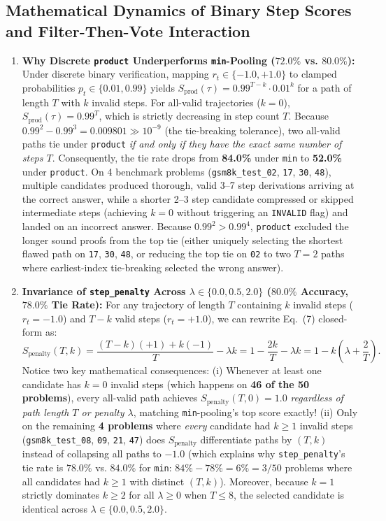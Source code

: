 \documentclass[10pt,a4paper]{article}
\begin{document}
\subsection{Mathematical Dynamics of Binary Step Scores and Filter-Then-Vote Interaction}
\begin{enumerate}
    \item \textbf{Why Discrete \texttt{product} Underperforms \texttt{min}-Pooling ($72.0\%$ vs. $80.0\%$):}
    Under discrete binary verification, mapping $r_t \in \{-1.0, +1.0\}$ to clamped probabilities $p_t \in \{0.01, 0.99\}$ yields $S_{\text{prod}}(\tau) = 0.99^{T-k} \cdot 0.01^k$ for a path of length $T$ with $k$ invalid steps. For all-valid trajectories ($k=0$), $S_{\text{prod}}(\tau) = 0.99^T$, which is strictly decreasing in step count $T$. Because $0.99^2 - 0.99^3 = 0.009801 \gg 10^{-9}$ (the tie-breaking tolerance), two all-valid paths tie under \texttt{product} \textit{if and only if they have the exact same number of steps $T$}. Consequently, the tie rate drops from \textbf{84.0\%} under \texttt{min} to \textbf{52.0\%} under \texttt{product}. On 4 benchmark problems (\texttt{gsm8k\_test\_02}, \texttt{17}, \texttt{30}, \texttt{48}), multiple candidates produced thorough, valid 3--7 step derivations arriving at the correct answer, while a shorter 2--3 step candidate compressed or skipped intermediate steps (achieving $k=0$ without triggering an \texttt{INVALID} flag) and landed on an incorrect answer. Because $0.99^2 > 0.99^4$, \texttt{product} excluded the longer sound proofs from the top tie (either uniquely selecting the shortest flawed path on \texttt{17}, \texttt{30}, \texttt{48}, or reducing the top tie on \texttt{02} to two $T=2$ paths where earliest-index tie-breaking selected the wrong answer).
    \item \textbf{Invariance of \texttt{step\_penalty} Across $\lambda \in \{0.0, 0.5, 2.0\}$ ($80.0\%$ Accuracy, $78.0\%$ Tie Rate):}
    For any trajectory of length $T$ containing $k$ invalid steps ($r_t = -1.0$) and $T-k$ valid steps ($r_t = +1.0$), we can rewrite Eq.~(7) closed-form as:
    \[
        S_{\text{penalty}}(T, k) = \frac{(T - k)(+1) + k(-1)}{T} - \lambda k = 1 - \frac{2k}{T} - \lambda k = 1 - k\left(\lambda + \frac{2}{T}\right).
    \]
    Notice two key mathematical consequences: (i) Whenever at least one candidate has $k=0$ invalid steps (which happens on \textbf{46 of the 50 problems}), every all-valid path achieves $S_{\text{penalty}}(T, 0) = 1.0$ \textit{regardless of path length $T$ or penalty $\lambda$}, matching \texttt{min}-pooling's top score exactly! (ii) Only on the remaining \textbf{4 problems} where \textit{every} candidate had $k \ge 1$ invalid steps (\texttt{gsm8k\_test\_08}, \texttt{09}, \texttt{21}, \texttt{47}) does $S_{\text{penalty}}$ differentiate paths by $(T, k)$ instead of collapsing all paths to $-1.0$ (which explains why \texttt{step\_penalty}'s tie rate is $78.0\%$ vs. $84.0\%$ for \texttt{min}: $84\% - 78\% = 6\% = 3/50$ problems where all candidates had $k \ge 1$ with distinct $(T,k)$). Moreover, because $k=1$ strictly dominates $k \ge 2$ for all $\lambda \ge 0$ when $T \le 8$, the selected candidate is identical across $\lambda \in \{0.0, 0.5, 2.0\}$.

\end{enumerate}
\end{document}
